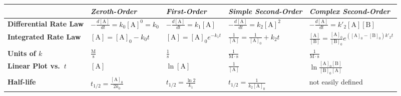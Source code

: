 \documentclass[
  9pt,
]{extbook}
\newcounter{none} %
\theoremstyle{definition}
\theoremstyle{definition}
\theoremstyle{definition}
\theoremstyle{definition}
\theoremstyle{remark}
\begin{document}
{\def\LTcaptype{none} %
\begin{longtable}[]{@{}
  >{\raggedright\arraybackslash}p{}
  >{\centering\arraybackslash}p{}
  >{\centering\arraybackslash}p{}
  >{\centering\arraybackslash}p{}
  >{\centering\arraybackslash}p{}@{}}
\toprule\noalign{}
\begin{minipage}[b]{\linewidth}\raggedright
\end{minipage} & \begin{minipage}[b]{\linewidth}\centering
\emph{Zeroth-Order}
\end{minipage} & \begin{minipage}[b]{\linewidth}\centering
\emph{First-Order}
\end{minipage} & \begin{minipage}[b]{\linewidth}\centering
\emph{Simple Second-Order}
\end{minipage} & \begin{minipage}[b]{\linewidth}\centering
\emph{Complex Second-Order}
\end{minipage} \\
\midrule\noalign{}
\endhead
\bottomrule\noalign{}
\endlastfoot
\textbf{Differential Rate Law} & \(-\frac{d[\mathrm{A}]}{dt}=k_0 [\mathrm{A}]^0 = k_0\) & \(-\frac{d[\mathrm{A}]}{dt}=k_1 [\mathrm{A}]\) & \(-\frac{d[\mathrm{A}]}{dt}=k_2 [\mathrm{A}]^2\) & \(-\frac{d[\mathrm{A}]}{dt}=k'_2 [\mathrm{A}][\mathrm{B}]\) \\
\textbf{Integrated Rate Law} & \([\mathrm{A}]=[\mathrm{A}]_0 -k_0 t\) & \([\mathrm{A}]=[\mathrm{A}]_0 e^{-k_1 t}\) & \(\frac{1}{[\mathrm{A}]}=\frac{1}{[\mathrm{A}]_0} + k_2 t\) & \(\frac{\mathrm{[A]}}{\mathrm{[B]}}=\frac{\mathrm{[A]_0}}{\mathrm{[B]_0}}e^{\left(\mathrm{[A]_0}-\mathrm{[B]_0}\right)k'_2t}\) \\
\textbf{Units of \(k\)} & \(\frac{\mathrm{M}}{\mathrm{s}}\) & \(\frac{1}{\mathrm{s}}\) & \(\frac{1}{\mathrm{M}\cdot \mathrm{s}}\) & \(\frac{1}{\mathrm{M}\cdot \mathrm{s}}\) \\
\textbf{Linear Plot vs.~\(t\)} & \([\mathrm{A}]\) & \(\ln [\mathrm{A}]\) & \(\frac{1}{[\mathrm{A}]}\) & \(\ln \frac{[\mathrm{A}]_0[\mathrm{B}]}{[\mathrm{B}]_0[\mathrm{A}]}\) \\
\textbf{Half-life} & \(t_{1/2}=\frac{[\mathrm{A}]_0}{2k_0}\) & \(t_{1/2}=\frac{\ln 2}{k_1}\) & \(t_{1/2}=\frac{1}{k_2 [\mathrm{A}]_0}\) & not easily defined \\
\end{longtable}
}
\end{document}
